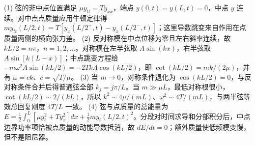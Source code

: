 (1) 弦的非中点位置满足 \(\mu y_{tt}=Ty_{xx}\)，端点 \(y(0,t)=y(L,t)=0\)，中点 \(y\) 连续。对中点点质量应用牛顿定律得 \(m y_{tt}(L/2,t)=T[y_x(L/2^+,t)-y_x(L/2^-,t)]\)；这里导数跳变来自作用在点质量两侧的横向张力差。
(2) 反对称模在中点位移为零且左右斜率连续，故 \(kL/2=n\pi\)，\(n=1,2,\ldots\)。对称模在左半弦取 \(A\sin(kx)\)，右半弦取 \(A\sin[k(L-x)]\)；中点跳变方程给 \(-m\omega^2A\sin(kL/2)=-2TkA\cos(kL/2)\)，即 \(\cot(kL/2)=mk/(2\mu)\)，并有 \(\omega=ck\)、\(c=\sqrt{T/\mu}\)。
(3) 当 \(m\to0\)，对称条件退化为 \(\cos(kL/2)=0\)，与反对称条件合并后得普通弦全部 \(k_j=j\pi/L\)。当 \(m\gg\mu L\)，最低对称根很小，\(\cot(kL/2)\sim2/(kL)\)，所以 \(k^2\sim4\mu/(mL)\)、\(\omega^2\sim4T/(mL)\)，与两半弦等效总回复刚度 \(4T/L\) 一致。
(4) 弦与点质量的总能量为 \(E=\frac12\int_0^L[\mu y_t^2+Ty_x^2]dx+\frac12m y_t(L/2,t)^2\)。分段对时间求导和分部积分后，中点边界功率项恰被点质量的动能导数抵消，故 \(dE/dt=0\)；额外质量使低频模变慢，但不是阻尼器。
